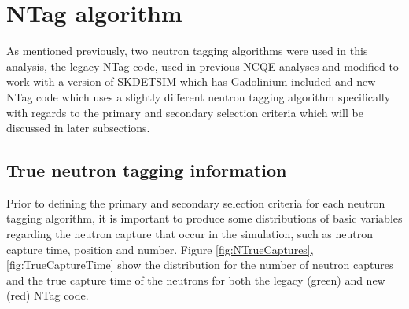 \section{NTag algorithm}

As mentioned previously, two neutron tagging algorithms were used in this analysis, the legacy NTag code, used in previous NCQE analyses and modified to work with a version of SKDETSIM which has Gadolinium included and new NTag code which uses a slightly different neutron tagging algorithm specifically with regards to the primary and secondary selection criteria which will be discussed in later subsections.



\subsection{True neutron tagging information}

Prior to defining the primary and secondary selection criteria for each neutron tagging algorithm, it is important to produce some distributions of basic variables regarding the neutron capture that occur in the simulation, such as neutron capture time, position and number. Figure \ref{fig:NTrueCaptures}, \ref{fig:TrueCaptureTime} show the distribution for the number of neutron captures and the true capture time of the neutrons for both the legacy (green) and new (red) NTag code.  

